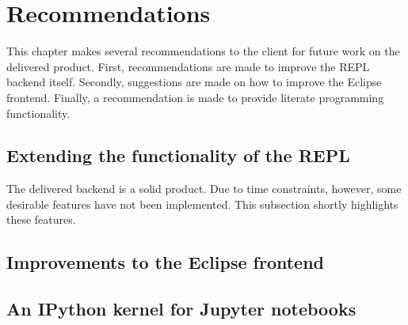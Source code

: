 \chapter{Recommendations}
\label{cha:recommendations}

This chapter makes several recommendations to the client for future work on the
delivered product. First, recommendations are made to improve the REPL backend
itself. Secondly, suggestions are made on how to improve the Eclipse frontend.
Finally, a recommendation is made to provide literate programming functionality.

\section{Extending the functionality of the REPL}
\label{sec:impr-backend}

The delivered backend is a solid product. Due to time constraints, however, some
desirable features have not been implemented. This subsection shortly highlights
these features.





\section{Improvements to the Eclipse frontend}
\label{sec:impr-eclipse}



\section{An IPython kernel for Jupyter notebooks}
\label{sec:discuss-literate-programming}



